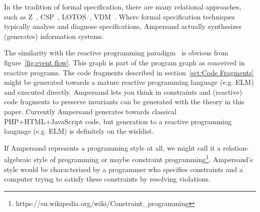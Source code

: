 \documentclass{elsarticle}
\begin{document}
	In the tradition of formal specification, there are many relational approaches, such as Z~\cite{Z}, CSP~\cite{CSP}, LOTOS~\cite{LOTOS}, VDM~\cite{VDM}.
	Where formal specification techniques typically analyse and diagnose specifications,
	Ampersand actually synthesizes (generates) information systems.

	The similarity with the reactive programming paradigm~\cite{Bainomugisha2013} is obvious from figure~\ref{fig:event flow}.
	This graph is part of the program graph as conceived in reactive programs.
	The code fragments described in section~\ref{sct:Code Fragments}
	might be generated towards a mature reactive programming language (e.g. ELM)
	and executed directly.
	Ampersand lets you think in constraints and (reactive) code fragments to preserve invariants can be generated with the theory in this paper.
	Currently Ampersand generates towards classical PHP+HTML+JavaScript code,
	but generation to a reactive programming language (e.g. ELM) is definitely on the wishlist.

	If Ampersand represents a programming style at all, we might call it a relation-algebraic style of programming or maybe constraint programming\footnote{https://en.wikipedia.org/wiki/Constraint\_programming}.
	Ampersand's style would be characterized by a programmer who specifies constraints and a computer trying to satisfy these constraints by resolving violations.
\end{document}
